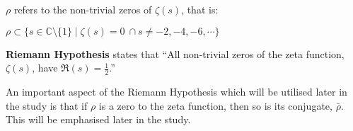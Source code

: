 \begin{Def} \label{def:RhoSimmetry}
	$\rho$ refers to the non-trivial zeros of $\zeta(s)$, that is: \par
	$\rho \subset \{s \in \mathbb{C} \setminus \{1\} \mid \zeta(s) = 0\ \cap s \ne -2, -4,-6,\cdots\} $
\end{Def}

\begin{Def} \label{def:RiemannHypothesis}
	\textbf{Riemann Hypothesis} states that ``All non-trivial zeros of the zeta function, $\zeta(s)$, have $\Re(s ) = \frac{1}{2}$.''
\end{Def}

An important aspect of the Riemann Hypothesis which will be utilised later in the study is that if $\rho$ is a zero to the zeta function, then so is its conjugate, $\bar{\rho}$. This will be emphasised later in the study.